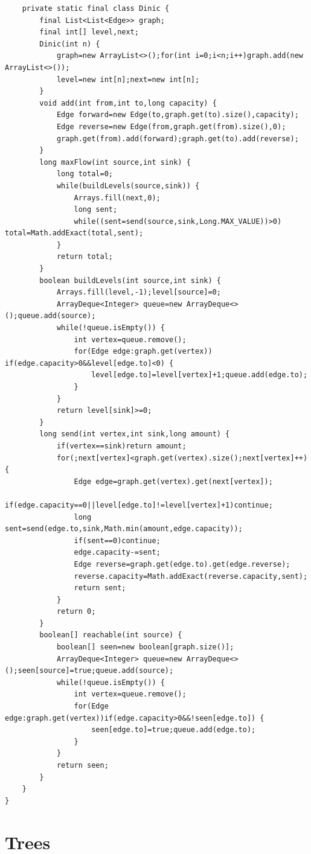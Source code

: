 \documentclass[10pt,letterpaper]{article}
\begin{document}
\begin{lstlisting}
    private static final class Dinic {
        final List<List<Edge>> graph;
        final int[] level,next;
        Dinic(int n) {
            graph=new ArrayList<>();for(int i=0;i<n;i++)graph.add(new ArrayList<>());
            level=new int[n];next=new int[n];
        }
        void add(int from,int to,long capacity) {
            Edge forward=new Edge(to,graph.get(to).size(),capacity);
            Edge reverse=new Edge(from,graph.get(from).size(),0);
            graph.get(from).add(forward);graph.get(to).add(reverse);
        }
        long maxFlow(int source,int sink) {
            long total=0;
            while(buildLevels(source,sink)) {
                Arrays.fill(next,0);
                long sent;
                while((sent=send(source,sink,Long.MAX_VALUE))>0) total=Math.addExact(total,sent);
            }
            return total;
        }
        boolean buildLevels(int source,int sink) {
            Arrays.fill(level,-1);level[source]=0;
            ArrayDeque<Integer> queue=new ArrayDeque<>();queue.add(source);
            while(!queue.isEmpty()) {
                int vertex=queue.remove();
                for(Edge edge:graph.get(vertex)) if(edge.capacity>0&&level[edge.to]<0) {
                    level[edge.to]=level[vertex]+1;queue.add(edge.to);
                }
            }
            return level[sink]>=0;
        }
        long send(int vertex,int sink,long amount) {
            if(vertex==sink)return amount;
            for(;next[vertex]<graph.get(vertex).size();next[vertex]++) {
                Edge edge=graph.get(vertex).get(next[vertex]);
                if(edge.capacity==0||level[edge.to]!=level[vertex]+1)continue;
                long sent=send(edge.to,sink,Math.min(amount,edge.capacity));
                if(sent==0)continue;
                edge.capacity-=sent;
                Edge reverse=graph.get(edge.to).get(edge.reverse);
                reverse.capacity=Math.addExact(reverse.capacity,sent);
                return sent;
            }
            return 0;
        }
        boolean[] reachable(int source) {
            boolean[] seen=new boolean[graph.size()];
            ArrayDeque<Integer> queue=new ArrayDeque<>();seen[source]=true;queue.add(source);
            while(!queue.isEmpty()) {
                int vertex=queue.remove();
                for(Edge edge:graph.get(vertex))if(edge.capacity>0&&!seen[edge.to]) {
                    seen[edge.to]=true;queue.add(edge.to);
                }
            }
            return seen;
        }
    }
}
\end{lstlisting}
\section{Trees}
\end{document}
